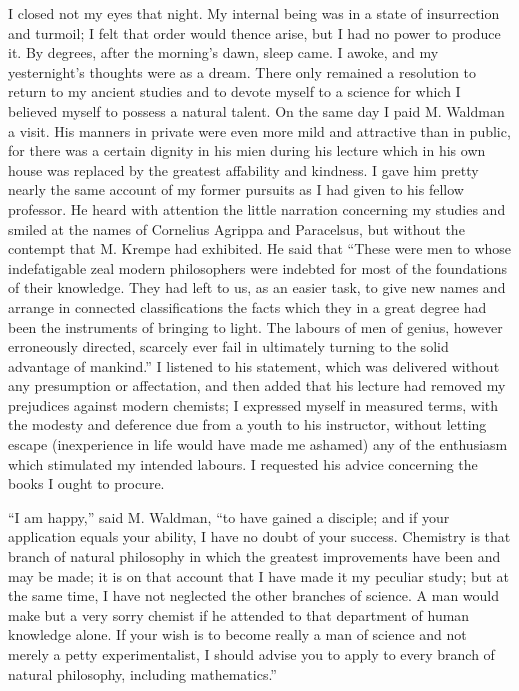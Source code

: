 \documentclass[12pt,openright]{book}
\begin{document}
I closed not my eyes that night. My internal being was in a state of insurrection and turmoil; I felt that order would thence arise, but I had no power to produce it. By degrees, after the morning’s dawn, sleep came. I awoke, and my yesternight’s thoughts were as a dream. There only remained a resolution to return to my ancient studies and to devote myself to a science for which I believed myself to possess a natural talent. On the same day I paid M. Waldman a visit. His manners in private were even more mild and attractive than in public, for there was a certain dignity in his mien during his lecture which in his own house was replaced by the greatest affability and kindness. I gave him pretty nearly the same account of my former pursuits as I had given to his fellow professor. He heard with attention the little narration concerning my studies and smiled at the names of Cornelius Agrippa and Paracelsus, but without the contempt that M. Krempe had exhibited. He said that “These were men to whose indefatigable zeal modern philosophers were indebted for most of the foundations of their knowledge. They had left to us, as an easier task, to give new names and arrange in connected classifications the facts which they in a great degree had been the instruments of bringing to light. The labours of men of genius, however erroneously directed, scarcely ever fail in ultimately turning to the solid advantage of mankind.” I listened to his statement, which was delivered without any presumption or affectation, and then added that his lecture had removed my prejudices against modern chemists; I expressed myself in measured terms, with the modesty and deference due from a youth to his instructor, without letting escape (inexperience in life would have made me ashamed) any of the enthusiasm which stimulated my intended labours. I requested his advice concerning the books I ought to procure.

“I am happy,” said M. Waldman, “to have gained a disciple; and if your application equals your ability, I have no doubt of your success. Chemistry is that branch of natural philosophy in which the greatest improvements have been and may be made; it is on that account that I have made it my peculiar study; but at the same time, I have not neglected the other branches of science. A man would make but a very sorry chemist if he attended to that department of human knowledge alone. If your wish is to become really a man of science and not merely a petty experimentalist, I should advise you to apply to every branch of natural philosophy, including mathematics.”
\end{document}
